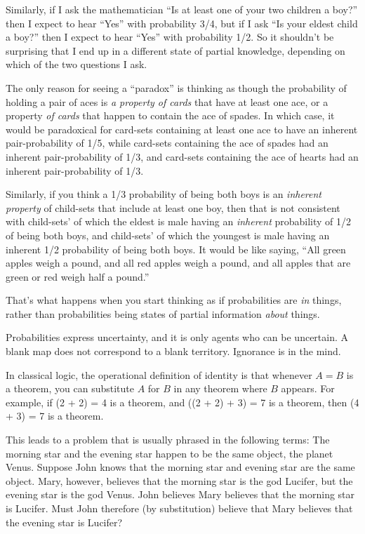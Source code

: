 {
 Similarly, if I ask the mathematician ``Is at
least one of your two children a boy?'' then I expect
to hear ``Yes'' with probability
3/4, but if I ask ``Is your eldest child a
boy?'' then I expect to hear
``Yes'' with probability 1/2. So it
shouldn't be surprising that I end up in a different
state of partial knowledge, depending on which of the two questions I
ask.}

{
 The only reason for seeing a
``paradox'' is thinking as though
the probability of holding a pair of aces is \textit{a property of
cards} that have at least one ace, or a property \textit{of cards} that
happen to contain the ace of spades. In which case, it would be
paradoxical for card-sets containing at least one ace to have an
inherent pair-probability of 1/5, while card-sets containing the ace of
spades had an inherent pair-probability of 1/3, and card-sets
containing the ace of hearts had an inherent pair-probability of 1/3.}

{
 Similarly, if you think a 1/3 probability of being both boys is an
\textit{inherent property} of child-sets that include at least one boy,
then that is not consistent with child-sets' of which
the eldest is male having an \textit{inherent} probability of 1/2 of
being both boys, and child-sets' of which the youngest
is male having an inherent 1/2 probability of being both boys. It would
be like saying, ``All green apples weigh a pound, and
all red apples weigh a pound, and all apples that are green or red
weigh half a pound.''}

{
 That's what happens when you start thinking as if
probabilities are \textit{in} things, rather than probabilities being
states of partial information \textit{about} things.}

{
 Probabilities express uncertainty, and it is only agents who can
be uncertain. A blank map does not correspond to a blank territory.
Ignorance is in the mind.}

\myendsectiontext


{
 In classical logic, the operational definition of identity is that
whenever $A = B$ is a theorem, you can substitute $A$ for $B$ in any theorem
where $B$ appears. For example, if (2 + 2) = 4 is a theorem, and ((2 + 2)
+ 3) = 7 is a theorem, then (4 + 3) = 7 is a theorem. }

{
 This leads to a problem that is usually phrased in the following
terms: The morning star and the evening star happen to be the same
object, the planet Venus. Suppose John knows that the morning star and
evening star are the same object. Mary, however, believes that the
morning star is the god Lucifer, but the evening star is the god Venus.
John believes Mary believes that the morning star is Lucifer. Must John
therefore (by substitution) believe that Mary believes that the evening
star is Lucifer?}

